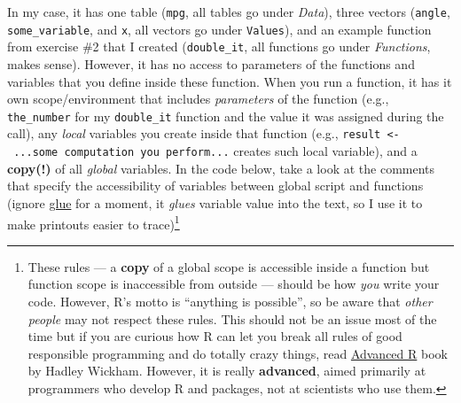 \documentclass[
]{book}
\begin{document}
In my case, it has one table (\texttt{mpg}, all tables go under \emph{Data}), three vectors (\texttt{angle}, \texttt{some\_variable}, and \texttt{x}, all vectors go under \texttt{Values}), and an example function from exercise \#2 that I created (\texttt{double\_it}, all functions go under \emph{Functions}, makes sense). However, it has no access to parameters of the functions and variables that you define inside these function. When you run a function, it has it own scope/environment that includes \emph{parameters} of the function (e.g., \texttt{the\_number} for my \texttt{double\_it} function and the value it was assigned during the call), any \emph{local} variables you create inside that function (e.g., \texttt{result\ \textless{}-\ ...some\ computation\ you\ perform...} creates such local variable), and a \textbf{copy(!)} of all \emph{global} variables. In the code below, take a look at the comments that specify the accessibility of variables between global script and functions (ignore \href{https://glue.tidyverse.org/reference/glue.html}{glue} for a moment, it \emph{glues} variable value into the text, so I use it to make printouts easier to trace)\footnote{These rules --- a \textbf{copy} of a global scope is accessible inside a function but function scope is inaccessible from outside --- should be how \emph{you} write your code. However, R's motto is ``anything is possible'', so be aware that \emph{other people} may not respect these rules. This should not be an issue most of the time but if you are curious how R can let you break all rules of good responsible programming and do totally crazy things, read \href{https://adv-r.hadley.nz/}{Advanced R} book by Hadley Wickham. However, it is really \textbf{advanced}, aimed primarily at programmers who develop R and packages, not at scientists who use them.}
\end{document}
